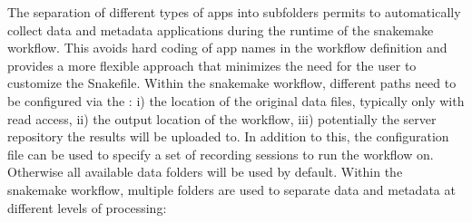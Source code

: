 The separation of different types of apps into subfolders permits to automatically collect data and metadata applications during the runtime of the snakemake workflow. This avoids hard coding of app names in the workflow definition and provides a more flexible approach that minimizes the need for the user to customize the Snakefile.
Within the snakemake workflow, different paths need to be configured via the : i) the location of the original data files, typically only with read access, ii) the output location of the workflow, iii) potentially the server repository the results will be uploaded to. In addition to this, the configuration file can be used to specify a set of recording sessions to run the workflow on. Otherwise all available data folders will be used by default.
Within the snakemake workflow, multiple folders are used to separate data and metadata at different levels of processing:\\

\begin{minipage}[t]{\textwidth}
\ \\
\end{minipage}



\paragraph{}

